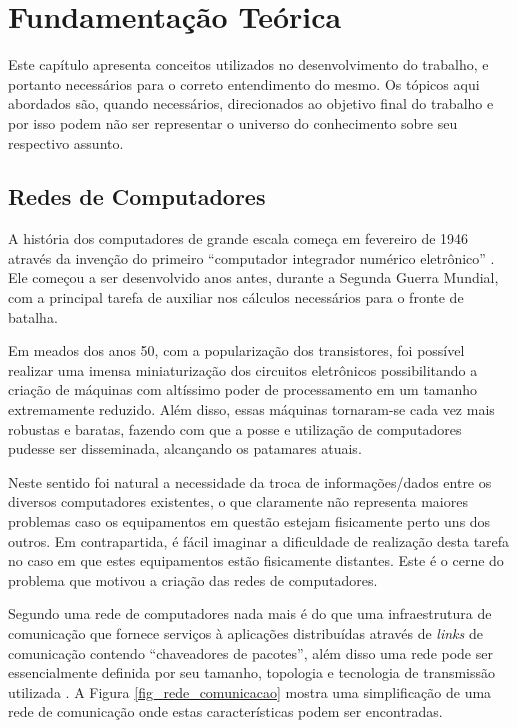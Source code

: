 \chapter{Fundamentação Teórica}
Este capítulo apresenta conceitos utilizados no desenvolvimento do trabalho, e portanto necessários para o correto entendimento do mesmo. Os tópicos aqui abordados são, quando necessários, direcionados ao objetivo final do trabalho e por isso podem não ser representar o universo do conhecimento sobre seu respectivo assunto.

\section{Redes de Computadores}
\label{redes-de-computadores}
A história dos computadores de grande escala começa em fevereiro de 1946 através da invenção do primeiro ``computador integrador numérico eletrônico''  \cite{Book-Jean2013}. Ele começou a ser desenvolvido anos antes, durante a Segunda Guerra Mundial, com a principal tarefa de auxiliar nos cálculos necessários para o fronte de batalha.

Em meados dos anos 50, com a popularização dos transistores, foi possível realizar uma imensa miniaturização dos circuitos eletrônicos possibilitando a criação de máquinas com altíssimo poder de processamento em um tamanho extremamente reduzido. Além disso, essas máquinas tornaram-se cada vez mais robustas e baratas, fazendo com que a posse e utilização de computadores pudesse ser disseminada, alcançando os patamares atuais.

Neste sentido foi natural a necessidade da troca de informações/dados entre os diversos computadores existentes, o que claramente não representa maiores problemas caso os equipamentos em questão estejam fisicamente perto uns dos outros. Em contrapartida, é fácil imaginar a dificuldade de realização desta tarefa no caso em que estes equipamentos estão fisicamente distantes. Este é o cerne do problema que motivou a criação das redes de computadores.

Segundo \cite{Book-Kurose2013} uma rede de computadores nada mais é do que uma infraestrutura de comunicação que fornece serviços à aplicações distribuídas através de \emph{links} de comunicação contendo ``chaveadores de pacotes'', além disso uma rede pode ser essencialmente definida por seu tamanho, topologia e tecnologia de transmissão utilizada \cite{Book-Tanenbaum2003}. A Figura \ref{fig_rede_comunicacao} mostra uma simplificação de uma rede de comunicação onde estas características podem ser encontradas.

